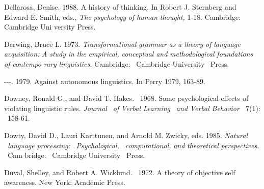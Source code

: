 \begin{styleStandard}
Dellarosa, Denise. 1988. A history of thinking. In Robert J. Sternberg and Edward E. Smith, eds., \textit{The}\textit{ }\textit{psychology}\textit{ }\textit{of}\textit{ }\textit{human}\textit{ }\textit{thought,}\textit{ }1-18. Cambridge: Cambridge Uni\- versity Press.
\end{styleStandard}


\begin{styleStandard}
Derwing, Bruce L. 1973. \textit{Transformational}\textit{ }\textit{grammar}\textit{ }\textit{as}\textit{ }\textit{a}\textit{ }\textit{theory}\textit{ }\textit{of}\textit{ }\textit{language}\textit{ }\textit{acquisition:}\textit{ }\textit{A}\textit{ }\textit{study}\textit{ }\textit{in}\textit{ }\textit{the}\textit{ }\textit{empirical,}\textit{ }\textit{conceptual}\textit{ }\textit{and}\textit{ }\textit{methodological}\textit{ }\textit{foundations}\textit{ }\textit{of}\textit{ }\textit{contempo\-}\textit{ }\textit{rary}\textit{ }\textit{linguistics.}\textit{ }Cambridge: \ Cambridge University \ Press.
\end{styleStandard}


\begin{styleStandard}
{}-{}-{}-. 1979. Against autonomous linguistics. In Perry 1979, 163-89.
\end{styleStandard}


\begin{styleStandard}
Downey, Ronald G., and David T. Hakes. \ 1968. Some psychological effects of violating linguistic rules. \textit{Journal }\textit{\ }\textit{of}\textit{ }\textit{Verbal}\textit{ }\textit{Learning }\textit{\ }\textit{and}\textit{ }\textit{Verbal}\textit{ }\textit{Behavior \ }7(1): \ 158-61.
\end{styleStandard}


\begin{styleStandard}
Dowty, David D., Lauri Karttunen, and Arnold M. Zwicky, eds. 1985. \textit{Natural }\textit{\ }\textit{language}\textit{ }\textit{processing: }\textit{\ }\textit{Psychological, }\textit{\ }\textit{computational,}\textit{ }\textit{and}\textit{ }\textit{theoretical}\textit{ }\textit{perspectives. }\textit{\ }Cam\- bridge: \ Cambridge University \ Press.
\end{styleStandard}


\begin{styleStandard}
Duval, Shelley, and Robert A. Wicklund. \ 1972. A theory of objective self awareness. New York: Academic Press.
\end{styleStandard}


